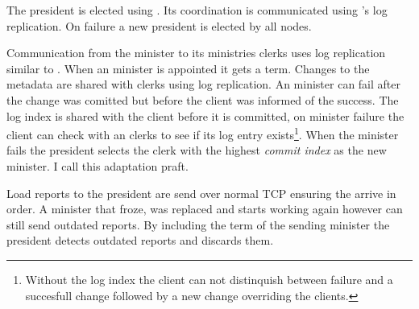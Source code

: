 The president is elected using \raft{}. Its coordination is communicated using \raft{}'s log replication. On failure a new president is elected by all nodes.

Communication from the minister to its ministries clerks uses log replication similar to \raft{}. When an minister is appointed it gets a \raft{} term. Changes to the metadata are shared with clerks using log replication. An minister can fail after the change was comitted but before the client was informed of the success. The log index is shared with the client before it is committed, on minister failure the client can check with an clerks to see if its log entry exists\footnote{Without the log index the client can not distinquish between failure and a succesfull change followed by a new change overriding the clients.}. When the minister fails the president selects the clerk with the highest \textsl{commit index} as the new minister. I call this adaptation \ac{praft}.

Load reports to the president are send over normal TCP ensuring the arrive in order. A minister that froze, was replaced and starts working again however can still send outdated reports. By including the term of the sending minister the president detects outdated reports and discards them.
%
